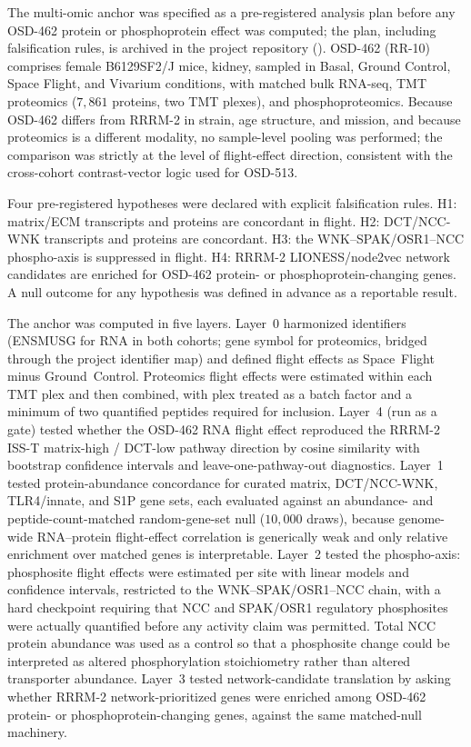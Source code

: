 \documentclass[11pt]{article}
\begin{document}
The multi-omic anchor was specified as a pre-registered analysis plan before any OSD-462 protein or phosphoprotein effect was computed; the plan, including falsification rules, is archived in the project repository (). OSD-462 (RR-10) comprises female B6129SF2/J mice, kidney, sampled in Basal, Ground Control, Space Flight, and Vivarium conditions, with matched bulk RNA-seq, TMT proteomics ($7{,}861$ proteins, two TMT plexes), and phosphoproteomics. Because OSD-462 differs from RRRM-2 in strain, age structure, and mission, and because proteomics is a different modality, no sample-level pooling was performed; the comparison was strictly at the level of flight-effect direction, consistent with the cross-cohort contrast-vector logic used for OSD-513.

Four pre-registered hypotheses were declared with explicit falsification rules. H1: matrix/ECM transcripts and proteins are concordant in flight. H2: DCT/NCC-WNK transcripts and proteins are concordant. H3: the WNK--SPAK/OSR1--NCC phospho-axis is suppressed in flight. H4: RRRM-2 LIONESS/node2vec network candidates are enriched for OSD-462 protein- or phosphoprotein-changing genes. A null outcome for any hypothesis was defined in advance as a reportable result.

The anchor was computed in five layers. Layer~0 harmonized identifiers (ENSMUSG for RNA in both cohorts; gene symbol for proteomics, bridged through the project identifier map) and defined flight effects as Space~Flight minus Ground~Control. Proteomics flight effects were estimated within each TMT plex and then combined, with plex treated as a batch factor and a minimum of two quantified peptides required for inclusion. Layer~4 (run as a gate) tested whether the OSD-462 RNA flight effect reproduced the RRRM-2 ISS-T matrix-high / DCT-low pathway direction by cosine similarity with bootstrap confidence intervals and leave-one-pathway-out diagnostics. Layer~1 tested protein-abundance concordance for curated matrix, DCT/NCC-WNK, TLR4/innate, and S1P gene sets, each evaluated against an abundance- and peptide-count-matched random-gene-set null ($10{,}000$ draws), because genome-wide RNA--protein flight-effect correlation is generically weak and only relative enrichment over matched genes is interpretable. Layer~2 tested the phospho-axis: phosphosite flight effects were estimated per site with linear models and confidence intervals, restricted to the WNK--SPAK/OSR1--NCC chain, with a hard checkpoint requiring that NCC and SPAK/OSR1 regulatory phosphosites were actually quantified before any activity claim was permitted. Total NCC protein abundance was used as a control so that a phosphosite change could be interpreted as altered phosphorylation stoichiometry rather than altered transporter abundance. Layer~3 tested network-candidate translation by asking whether RRRM-2 network-prioritized genes were enriched among OSD-462 protein- or phosphoprotein-changing genes, against the same matched-null machinery.
\end{document}
